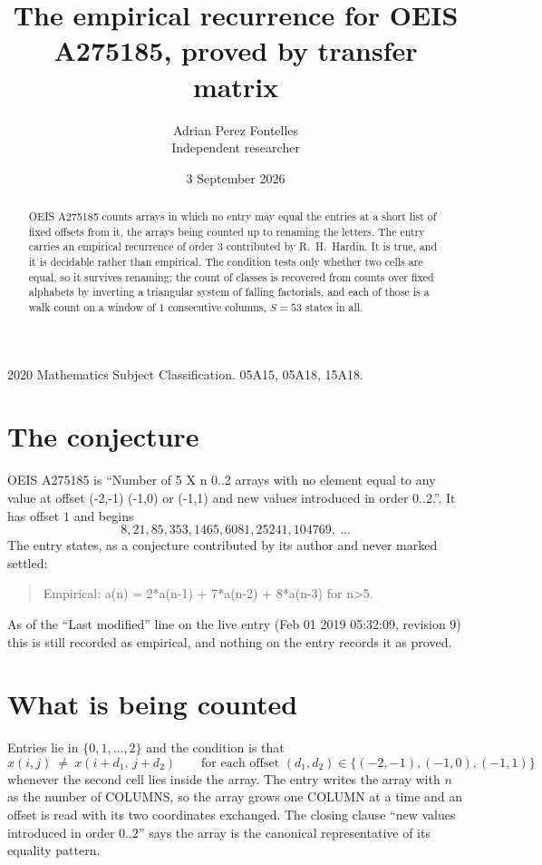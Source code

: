 \documentclass[11pt,a4paper]{article}
\title{The empirical recurrence for OEIS A275185, proved by transfer matrix}
\author{Adrian Perez Fontelles\\ \small Independent researcher}
\date{3 September 2026}
\theoremstyle{plain}
\theoremstyle{definition}
\begin{document}
\maketitle

\begin{abstract}
OEIS A275185 counts arrays in which no entry may equal the entries at a short list of fixed offsets
from it, the arrays being counted up to renaming the letters. The entry carries an empirical
recurrence of order $3$ contributed by R.~H.~Hardin. It is true, and it is decidable
rather than empirical. The condition tests only whether two cells are equal, so it survives
renaming; the count of classes is recovered from counts over fixed alphabets by inverting a
triangular system of falling factorials, and each of those is a walk count on a window of
$1$ consecutive columns, $S=53$ states in all.
\end{abstract}

\noindent\small 2020 Mathematics Subject Classification. 05A15, 05A18, 15A18.\normalsize

\section{The conjecture}

OEIS A275185 is ``Number of 5 X n 0..2 arrays with no element equal to any value at offset (-2,-1) (-1,0) or (-1,1) and new values introduced in order 0..2.''. It has offset $1$ and begins
\[
8, 21, 85, 353, 1465, 6081, 25241, 104769,\ \dots
\]
The entry states, as a conjecture contributed by its author and never marked settled:
\begin{quote}
Empirical: a(n) = 2*a(n-1) + 7*a(n-2) + 8*a(n-3) for n>5.
\end{quote}
As of the ``Last modified'' line on the live entry (Feb 01 2019 05:32:09, revision 9) this is still
recorded as empirical, and nothing on the entry records it as proved.

\section{What is being counted}

Entries lie in $\{0,1,\dots,2\}$ and the condition is that
\[
x(i,j)\ \ne\ x(i+d_1,\,j+d_2)\qquad\text{for each offset }(d_1,d_2)\in\{(-2,-1), (-1,0), (-1,1)\}
\]
whenever the second cell lies inside the array. The entry writes the array with $n$ as the number of COLUMNS, so the array grows one COLUMN at a time and an offset is read with its two coordinates exchanged. The closing clause ``new values
introduced in order $0..2$'' says the array is the canonical representative of its equality
pattern.
\end{document}
